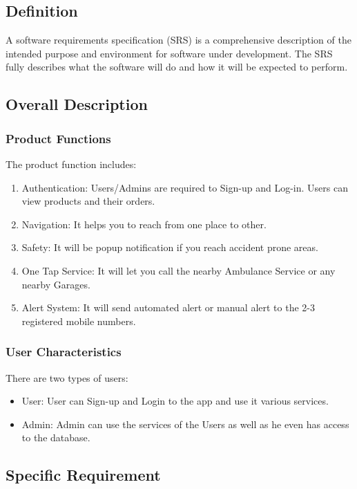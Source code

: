 \documentclass{article}
\begin{document}
\begin{flushleft}
        \subsection{Definition}
        A software requirements specification (SRS) is a comprehensive description of the intended purpose and environment for software under development. The SRS fully describes what the software will do and how it will be expected to perform. 
        \subsection{Overall Description}
            \subsubsection{Product Functions}
            The product function includes: 
            \begin{enumerate}
                \item Authentication: Users/Admins are required to Sign-up and Log-in. Users can view products and their orders.
                \item Navigation: It helps you to reach from one place to other.
                \item Safety: It will be popup notification if you reach accident prone areas.
                \item One Tap Service: It will let you call the nearby Ambulance Service or any nearby Garages.
                \item Alert System: It will send automated alert or manual alert to the 2-3 registered mobile numbers.
            \end{enumerate}
            
            \subsubsection{User Characteristics}
            There are two types of users: 
            \begin{itemize}
                \item User: User can Sign-up and Login to the app and use it various services.
                \item Admin: Admin can use the services of the Users as well as he even has access to the database.
            \end{itemize}
            
            
        \subsection{Specific Requirement}

\end{flushleft}
\end{document}
